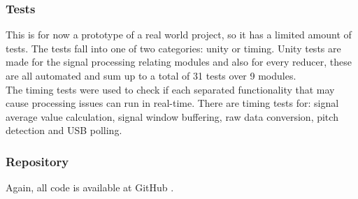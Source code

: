 \subsubsection{Tests}
This is for now a prototype of a real world project, so it has a limited amount
of tests. The tests fall into one of two categories: unity or timing. Unity tests
are made for the signal processing relating modules and also for every reducer,
these are all automated and sum up to a total of 31 tests over 9 modules. \\
The timing tests were used to check if each separated functionality that may
cause processing issues can run in real-time. There are timing tests for: signal
average value calculation, signal window buffering, raw data conversion,
pitch detection and USB polling.

\subsubsection{Repository}
Again, all code is available at GitHub \cite{guitar-digitizer}.
